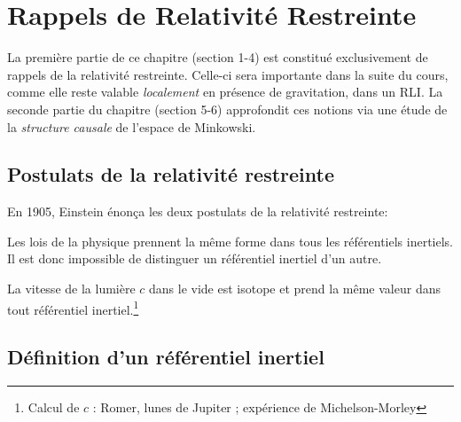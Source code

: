 {
\renewcommand\indexmarker{\cdot}


\chapter{Rappels de Relativité Restreinte}
La première partie de ce chapitre (section 1-4) est constitué exclusivement de rappels de la relativité restreinte. Celle-ci sera importante dans la suite du cours, comme elle reste valable \emph{localement} en présence de gravitation, dans un RLI. La seconde partie du chapitre (section 5-6) approfondit ces notions via une étude de la \emph{structure causale} de l'espace de Minkowski.


\section{Postulats de la relativité restreinte}
En 1905, Einstein énonça les deux postulats de la relativité restreinte:
\begin{theoremframe}
    \begin{post}
        Les lois de la physique prennent la même forme dans tous les référentiels inertiels. Il est donc impossible de distinguer un référentiel inertiel d'un autre.
    \end{post}
\end{theoremframe}
\begin{theoremframe}
    \begin{post}
        La vitesse de la lumière $c$ dans le vide est isotope et prend la même valeur dans tout référentiel inertiel.\footnote{Calcul de $c$ : Romer, lunes de Jupiter ; expérience de Michelson-Morley}
    \end{post}
\end{theoremframe}
\section{Définition d'un référentiel inertiel}

}
